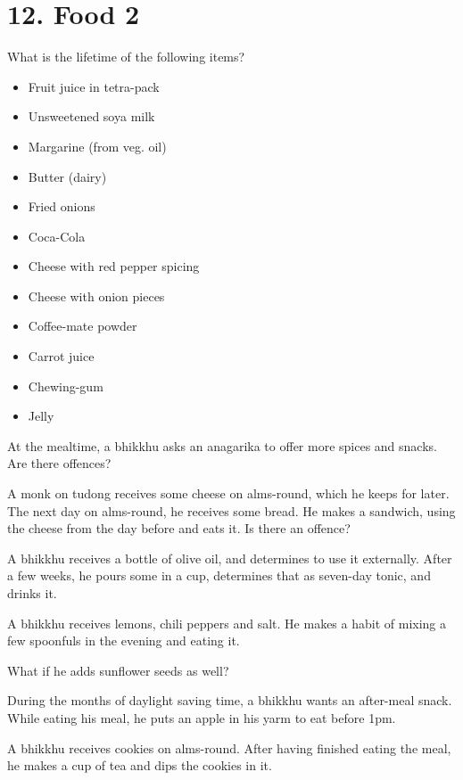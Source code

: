 \chapter{12. Food 2}
\renewcommand*{\theChapterTitle}{12. Food 2}

What is the lifetime of the following items?

\begin{itemize}

\item Fruit juice in tetra-pack
\item Unsweetened soya milk
\item Margarine (from veg. oil)
\item Butter (dairy)
\item Fried onions
\item Coca-Cola
\item Cheese with red pepper spicing
\item Cheese with onion pieces
\item Coffee-mate powder
\item Carrot juice
\item Chewing-gum
\item Jelly

\end{itemize}

\bigskip

At the mealtime, a bhikkhu asks an anagarika to offer more spices and snacks.
Are there offences?

\bigskip

A monk on tudong receives some cheese on alms-round, which he keeps for later.
The next day on alms-round, he receives some bread. He makes a sandwich, using
the cheese from the day before and eats it. Is there an offence?

\bigskip

A bhikkhu receives a bottle of olive oil, and determines to use it externally.
After a few weeks, he pours some in a cup, determines that as seven-day tonic,
and drinks it.

\bigskip

A bhikkhu receives lemons, chili peppers and salt. He makes a habit of mixing a
few spoonfuls in the evening and eating it.

\bigskip

What if he adds sunflower seeds as well?

\bigskip

During the months of daylight saving time, a bhikkhu wants an after-meal snack.
While eating his meal, he puts an apple in his yarm to eat before 1pm.

\bigskip

A bhikkhu receives cookies on alms-round. After having finished eating the meal, he makes a cup of tea and
dips the cookies in it.

